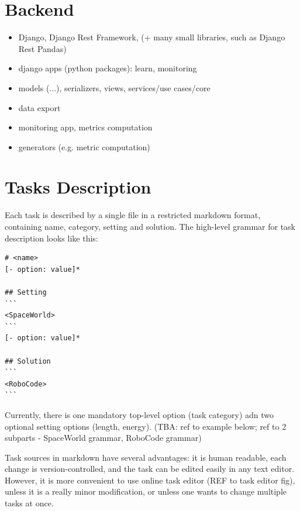 \section{Backend}

\begin{itemize}
\item Django, Django Rest Framework, (+ many small libraries, such as Django Rest Pandas)
\item django apps (python packages): learn, monitoring
\item models (...), serializers, views, services/use cases/core
\item data export
\item monitoring app, metrics computation
\item generators (e.g. metric computation)
\end{itemize}


\section{Tasks Description}

Each task is described by a single file in a restricted markdown format,
containing name, category, setting and solution.
The high-level grammar for task description looks like this:

\begin{lstlisting}
# <name>
[- option: value]*

## Setting
```
<SpaceWorld>
```
[- option: value]*

## Solution
```
<RoboCode>
```
\end{lstlisting}

Currently, there is one mandatory top-level option (task category)
adn two optional setting options (length, energy).
(TBA: ref to example below; ref to 2 subparts - SpaceWorld grammar, RoboCode grammar)

Task sources in markdown have several advantages:
it is human readable,
each change is version-controlled,
and the task can be edited easily in any text editor.
However, it is more convenient to use online task editor (REF to task editor fig),
unless it is a really minor modification, or unless one wants to change multiple tasks at once.




